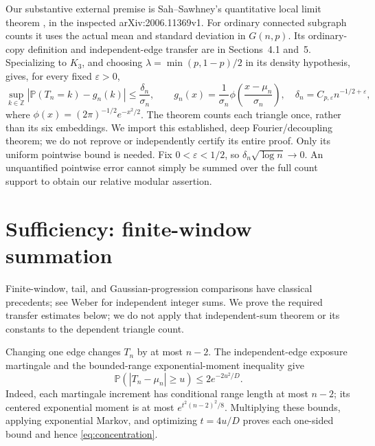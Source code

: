 \documentclass[11pt]{article}
\newcommand{\Pp}{\mathbb P}
\newcommand{\Z}{\mathbb Z}
\begin{document}
Our substantive external premise is Sah--Sawhney's quantitative
local limit theorem \cite[Theorem~1.1]{SS}, in the inspected
arXiv:2006.11369v1. For ordinary connected subgraph counts it uses the
actual mean and standard deviation in \(G(n,p)\). Its ordinary-copy
definition and independent-edge transfer are in Sections~4.1 and~5.
Specializing to \(K_3\), and choosing
\(\lambda=\min(p,1-p)/2\) in its density hypothesis, gives, for every
fixed \(\varepsilon>0\),
\begin{equation}\label{eq:llt}
 \sup_{k\in\Z}\left|\Pp(T_n=k)-g_n(k)\right|
 \leq\frac{\delta_n}{\sigma_n},\qquad
 g_n(x)=\frac1{\sigma_n}\phi\!\left(\frac{x-\mu_n}{\sigma_n}\right),
 \quad \delta_n=C_{p,\varepsilon}n^{-1/2+\varepsilon},
\end{equation}
where \(\phi(x)=(2\pi)^{-1/2}e^{-x^2/2}\). The theorem counts each
triangle once, rather than its six embeddings. We import this established,
deep Fourier/decoupling theorem; we do not reprove or independently certify
its entire proof. Only its uniform pointwise bound is needed. Fix
\(0<\varepsilon<1/2\), so \(\delta_n\sqrt{\log n}\to0\).
An unquantified pointwise error cannot simply be summed over the full
count support to obtain our relative modular assertion.

\section{Sufficiency: finite-window summation}

Finite-window, tail, and Gaussian-progression comparisons have classical
precedents; see Weber \cite[Theorem~1.4 and its proof in the 2022 preprint]{W}
for independent integer sums. We prove the required transfer estimates below;
we do not apply that independent-sum theorem or its constants to the
dependent triangle count.

Changing one edge changes \(T_n\) by at most \(n-2\). The independent-edge
exposure martingale and the bounded-range exponential-moment inequality
give
\begin{equation}\label{eq:concentration}
 \Pp(|T_n-\mu_n|\geq u)\leq2e^{-2u^2/D}.
\end{equation}
Indeed, each martingale increment has conditional range length at most
\(n-2\); its centered exponential moment is at most
\(e^{t^2(n-2)^2/8}\). Multiplying these bounds, applying exponential
Markov, and optimizing \(t=4u/D\) proves each one-sided bound and hence
\eqref{eq:concentration}.
\end{document}
